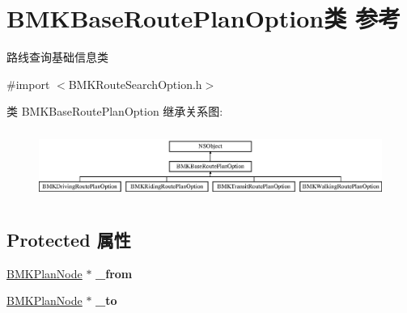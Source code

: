 \hypertarget{interface_b_m_k_base_route_plan_option}{}\section{B\+M\+K\+Base\+Route\+Plan\+Option类 参考}
\label{interface_b_m_k_base_route_plan_option}


路线查询基础信息类  




{\ttfamily \#import $<$B\+M\+K\+Route\+Search\+Option.\+h$>$}

类 B\+M\+K\+Base\+Route\+Plan\+Option 继承关系图\+:\begin{figure}[H]
\begin{center}
\leavevmode
\includegraphics[height=2.270270cm]{interface_b_m_k_base_route_plan_option}
\end{center}
\end{figure}
\subsection*{Protected 属性}
\begin{DoxyCompactItemize}
\item 
\hypertarget{interface_b_m_k_base_route_plan_option_a1a668d22cbdfdf6f4b619522a5c24482}{}\hyperlink{interface_b_m_k_plan_node}{B\+M\+K\+Plan\+Node} $\ast$ {\bfseries \+\_\+from}\label{interface_b_m_k_base_route_plan_option_a1a668d22cbdfdf6f4b619522a5c24482}

\item 
\hypertarget{interface_b_m_k_base_route_plan_option_a57edc8a986cecead42fef9e55949157c}{}\hyperlink{interface_b_m_k_plan_node}{B\+M\+K\+Plan\+Node} $\ast$ {\bfseries \+\_\+to}\label{interface_b_m_k_base_route_plan_option_a57edc8a986cecead42fef9e55949157c}

\end{DoxyCompactItemize}
